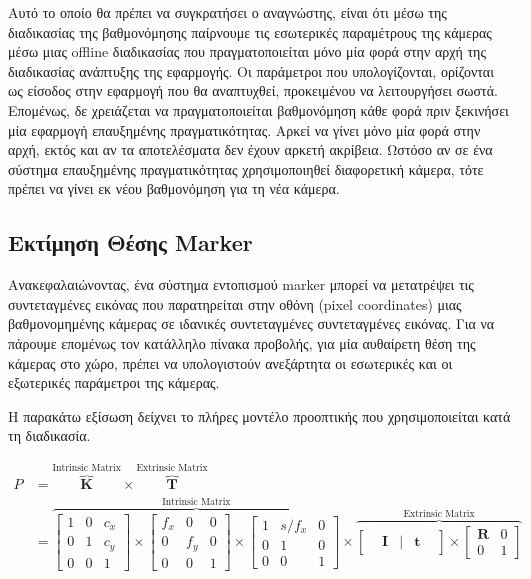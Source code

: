Αυτό το οποίο θα πρέπει να συγκρατήσει ο αναγνώστης, είναι ότι μέσω της διαδικασίας της βαθμονόμησης παίρνουμε τις εσωτερικές παραμέτρους της κάμερας μέσω μιας offline διαδικασίας που πραγματοποιείται μόνο μία φορά στην αρχή της διαδικασίας ανάπτυξης της εφαρμογής. Οι παράμετροι που υπολογίζονται, ορίζονται ως είσοδος στην εφαρμογή που θα αναπτυχθεί, προκειμένου να λειτουργήσει σωστά. Επομένως, δε χρειάζεται να πραγματοποιείται βαθμονόμηση κάθε φορά πριν ξεκινήσει μία εφαρμογή επαυξημένης πραγματικότητας. Αρκεί να γίνει μόνο μία φορά στην αρχή, εκτός και αν τα αποτελέσματα δεν έχουν αρκετή ακρίβεια. Ωστόσο αν σε ένα σύστημα επαυξημένης πραγματικότητας χρησιμοποιηθεί διαφορετική κάμερα, τότε πρέπει να γίνει εκ νέου βαθμονόμηση για τη νέα κάμερα.







\subsection{Εκτίμηση Θέσης Marker}

Ανακεφαλαιώνοντας, ένα σύστημα εντοπισμού marker μπορεί να μετατρέψει τις συντεταγμένες εικόνας που παρατηρείται στην οθόνη (pixel coordinates) μιας βαθμονομημένης κάμερας σε ιδανικές συντεταγμένες συντεταγμένες εικόνας. 
Για να πάρουμε επομένως τον κατάλληλο πίνακα προβολής, για μία αυθαίρετη θέση της κάμερας στο χώρο, πρέπει να υπολογιστούν ανεξάρτητα οι εσωτερικές και οι εξωτερικές παράμετροι της κάμερας. 



Η παρακάτω εξίσωση δείχνει το πλήρες μοντέλο προοπτικής που χρησιμοποιείται κατά τη διαδικασία.


\begin{equation} 
\begin{split}
P
&=
\overbrace{
\mathbf{K}}^\text{Intrinsic Matrix} \times 
\overbrace{
\mathbf{T}
}^\text{Extrinsic Matrix} 
\\&=
\overbrace{
\begin{bmatrix}
1 & 0 & c_{x} \\ 
0 & 1 & c_{y} \\ 
0 & 0 & 1  
\end{bmatrix}
\times 
\begin{bmatrix}
f_{x} & 0 & 0 \\ 
0 & f_{y} & 0 \\ 
0 & 0 & 1  
\end{bmatrix}
\times
\begin{bmatrix}
1 & s/f_{x} & 0 \\ 
0 & 1 & 0 \\ 
0 & 0 & 1  
\end{bmatrix}
}^\text{Intrinsic Matrix}
\times
\overbrace{
\begin{bmatrix}
&\mathbf{I}& |& \mathbf{t}&
\end{bmatrix}
\times
\begin{bmatrix}
\mathbf{R} &    0 \\
0 &    1 
\end{bmatrix}}^\text{Extrinsic Matrix}
\end{split}
\end{equation}


